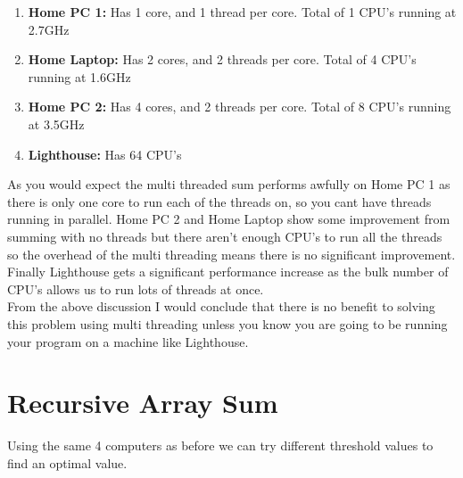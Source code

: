 \documentclass[a4paper, 12pt]{article}
\begin{document}
		
		\begin{enumerate}
			\item \textbf{Home PC 1:} Has 1 core, and 1 thread per core. Total of 1 CPU's running at 2.7GHz
			
			\item \textbf{Home Laptop:} Has 2 cores, and 2 threads per core. Total of 4 CPU's running at 1.6GHz
			
			\item \textbf{Home PC 2:} Has 4 cores, and 2 threads per core. Total of 8 CPU's running at 3.5GHz
			
			\item \textbf{Lighthouse:} Has 64 CPU's
		\end{enumerate}
	
		As you would expect the multi threaded sum performs awfully on Home PC 1 as there is only one core to run each of the threads on, so you cant have threads running in parallel. Home PC 2 and Home Laptop show some improvement from summing with no threads but there aren't enough CPU's to run all the threads so the overhead of the multi threading means there is no significant improvement. Finally Lighthouse gets a significant performance increase as the bulk number of CPU's allows us to run lots of threads at once.\\
		
		From the above discussion I would conclude that there is no benefit to solving this problem using multi threading unless you know you are going to be running your program on a machine like Lighthouse.
	
	\newpage	
	
		
	\section{Recursive Array Sum}
		Using the same 4 computers as before we can try different threshold values to find an optimal value.
		
\end{document}
